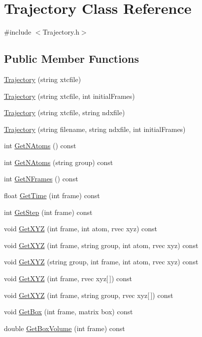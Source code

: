 \hypertarget{classTrajectory}{\section{Trajectory Class Reference}
\label{classTrajectory}
}


{\ttfamily \#include $<$Trajectory.\-h$>$}

\subsection*{Public Member Functions}
\begin{DoxyCompactItemize}
\item 
\hyperlink{classTrajectory_a354835acf30d09f1cea3be717923c496}{Trajectory} (string xtcfile)
\item 
\hyperlink{classTrajectory_ad5b14c848a90b221f84284ed5983dd8b}{Trajectory} (string xtcfile, int initial\-Frames)
\item 
\hyperlink{classTrajectory_a5ba17a4ba9c36cf7113e2bfef8c4b508}{Trajectory} (string xtcfile, string ndxfile)
\item 
\hyperlink{classTrajectory_ac127cb24e6ac704a6a0900f90f070e05}{Trajectory} (string filename, string ndxfile, int initial\-Frames)
\item 
int \hyperlink{classTrajectory_afdb7df7848002e17e21f93e9d64aea61}{Get\-N\-Atoms} () const 
\item 
int \hyperlink{classTrajectory_ae423004c36678dd56f096b2b598bb1eb}{Get\-N\-Atoms} (string group) const 
\item 
int \hyperlink{classTrajectory_a3bc23364e250667c611a1a2b77b5a7ca}{Get\-N\-Frames} () const 
\item 
float \hyperlink{classTrajectory_a3d8ba3dccd4b77e8da7202ae5e1b4f57}{Get\-Time} (int frame) const 
\item 
int \hyperlink{classTrajectory_afb9c2f6337f280b4ad7a79bbc1922fd9}{Get\-Step} (int frame) const 
\item 
void \hyperlink{classTrajectory_a61796932f5c48e4c0c45eb2f68ac8181}{Get\-X\-Y\-Z} (int frame, int atom, rvec xyz) const 
\item 
void \hyperlink{classTrajectory_a578dc57f9401085dbea9c8b70e5e84b6}{Get\-X\-Y\-Z} (int frame, string group, int atom, rvec xyz) const 
\item 
void \hyperlink{classTrajectory_af52d25747fe4f88ca1e196a235584306}{Get\-X\-Y\-Z} (string group, int frame, int atom, rvec xyz) const 
\item 
void \hyperlink{classTrajectory_a2d8f37652c1ef658a821456a86d69341}{Get\-X\-Y\-Z} (int frame, rvec xyz\mbox{[}$\,$\mbox{]}) const 
\item 
void \hyperlink{classTrajectory_a06ca8c7ad89d301d7615964f1f219d57}{Get\-X\-Y\-Z} (int frame, string group, rvec xyz\mbox{[}$\,$\mbox{]}) const 
\item 
void \hyperlink{classTrajectory_aab421c9ee39248ba8e878e1926fdba3b}{Get\-Box} (int frame, matrix box) const 
\item 
double \hyperlink{classTrajectory_a147406783cfebe3072057b37609c2d3a}{Get\-Box\-Volume} (int frame) const 
\end{DoxyCompactItemize}


